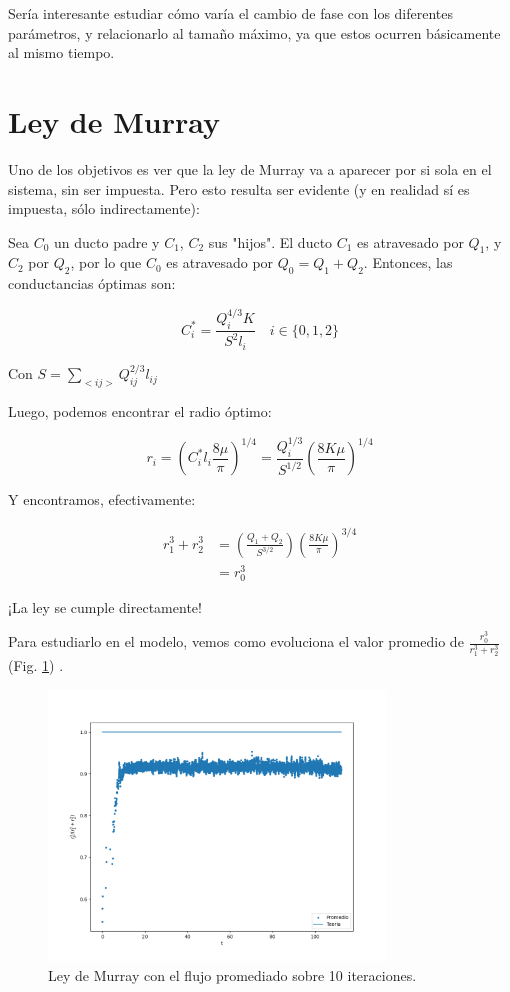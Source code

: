\documentclass{article}
\begin{document}
Sería interesante estudiar cómo varía el cambio de fase con los diferentes parámetros, y relacionarlo al tamaño máximo, ya que estos ocurren básicamente al mismo tiempo.
\section{Ley de Murray}

Uno de los objetivos es ver que la ley de Murray va a aparecer por si sola en el sistema, sin ser impuesta. Pero esto resulta ser evidente (y en realidad sí es impuesta, sólo indirectamente):

Sea $C_0$ un ducto padre y $C_1$, $C_2$ sus "hijos". El ducto $C_1$ es atravesado por $Q_1$, y $C_2$ por $Q_2$, por lo que $C_0$ es atravesado por $Q_0 = Q_1 + Q_2$. Entonces, las conductancias óptimas son:

$$ C_i^* = \frac{Q_i^{4/3} K}{S^2 l_i} \quad i\in\{0,1,2\} $$

Con $ S = \sum_{<ij>}Q_{ij}^{2/3}l_{ij} $

Luego, podemos encontrar el radio óptimo:

$$ r_i = \left( C_i^* l_i \frac{8 \mu}{\pi} \right)^{1/4} = \frac{Q_i^{1/3}}{S^{1/2}}\left(\frac{8K\mu}{\pi}\right)^{1/4}$$

Y encontramos, efectivamente:

\begin{align*}
    r_1^3 + r_2^3 & = \left(\frac{Q_1 + Q_2}{S^{3/2}}\right)\left(\frac{8K\mu}{\pi}\right)^{3/4} \\
    & = r_0^3
\end{align*}

¡La ley se cumple directamente!

Para estudiarlo en el modelo, vemos como evoluciona el valor promedio de $\frac{r_0^3}{r_1^3+r_2^3}$ (Fig. \ref{fig:murray_feo}) .

\begin{figure}[h!]
    \centering
    \includegraphics[width=0.8\textwidth]{graficos_inst/murray_feo.png}
    \caption{Ley de Murray con el flujo promediado sobre 10 iteraciones.}
    \label{fig:murray_feo}
\end{figure}
\end{document}
